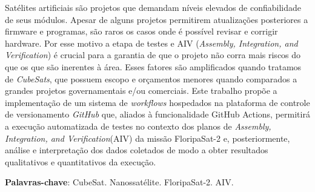 \setlength{\absparsep}{18pt} %
\begin{resumo}
	\SingleSpacing
	Satélites artificiais são projetos que demandam níveis elevados de confiabilidade de seus módulos. Apesar de alguns projetos permitirem atualizações posteriores a firmware e programas, são raros os casos onde é possível revisar e corrigir hardware. Por esse motivo a etapa de testes e AIV (\textit{Assembly, Integration, and Verification}) é crucial para a garantia de que o projeto não corra mais riscos do que os que são inerentes à área. Esses fatores são amplificados quando tratamos de \textit{CubeSats}, que possuem escopo e orçamentos menores quando comparados a grandes projetos governamentais e/ou comerciais. Este trabalho propõe a implementação de um sistema de \textit{workflows} hospedados na plataforma de controle de versionamento \textit{GitHub} que, aliados à funcionalidade GitHub Actions, permitirá a execução automatizada de testes no contexto dos planos de \emph{Assembly, Integration, and Verification}(AIV) da missão FloripaSat-2 e, posteriormente, análise e interpretação dos dados coletados de modo a obter resultados qualitativos e quantitativos da execução.
	
	
	\textbf{Palavras-chave}: CubeSat. Nanossatélite. FloripaSat-2. AIV.
\end{resumo}

